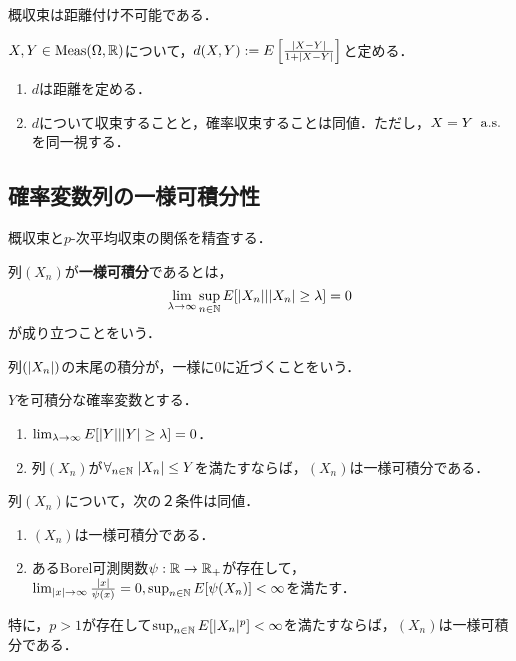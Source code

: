 \documentclass[uplatex,dvipdfmx]{jsreport}
\begin{document}
\begin{proposition}
    概収束は距離付け不可能である．
\end{proposition}

\begin{proposition}
    $X,Y\in\mathrm{Meas}(\Omega,\mathbb{R})$について，$d(X,Y):=E\left[\frac{\lvert X-Y\rvert}{1+\lvert X-Y\rvert}\right]$と定める．
    \begin{enumerate}
        \item $d$は距離を定める．
        \item $d$について収束することと，確率収束することは同値．ただし，$X=Y\;\;\mathrm{a.s.}$を同一視する．
    \end{enumerate}
\end{proposition}

\subsection{確率変数列の一様可積分性}

\begin{tcolorbox}[colframe=ForestGreen, colback=ForestGreen!10!white,breakable,colbacktitle=ForestGreen!40!white,coltitle=black,fonttitle=\bfseries\sffamily,
title=]
    概収束と$p$-次平均収束の関係を精査する．

\end{tcolorbox}

\begin{definition}
    列$(X_n)$が\textbf{一様可積分}であるとは，
    \[\lim_{\lambda\to\infty}\sup_{n\in\mathbb{N}}E[\lvert X_n\rvert|\lvert X_n\rvert\ge\lambda]=0\]
    が成り立つことをいう．
\end{definition}
\begin{remarks}
    列$(\lvert X_n\rvert)$の末尾の積分が，一様に$0$に近づくことをいう．
\end{remarks}

\begin{lemma}[一様可積分性の十分条件]
    $Y$を可積分な確率変数とする．
    \begin{enumerate}
        \item $\lim_{\lambda\to\infty}E[\lvert Y\rvert|\lvert Y\rvert\ge\lambda]=0$．
        \item 列$(X_n)$が$\forall_{n\in\mathbb{N}}\;\lvert X_n\rvert\le Y$を満たすならば，$(X_n)$は一様可積分である．
    \end{enumerate}
\end{lemma}

\begin{lemma}[一様可積分性の特徴付け]
    列$(X_n)$について，次の２条件は同値．
    \begin{enumerate}
        \item $(X_n)$は一様可積分である．
        \item あるBorel可測関数$\psi:\mathbb{R}\to\mathbb{R}_+$が存在して，$\lim_{\lvert x\rvert\to\infty}\frac{\lvert x\rvert}{\psi(x)}=0,\sup_{n\in\mathbb{N}}E[\psi(X_n)]<\infty$を満たす．
    \end{enumerate}
    特に，$p>1$が存在して$\sup_{n\in\mathbb{N}}E[\lvert X_n\rvert^p]<\infty$を満たすならば，$(X_n)$は一様可積分である．
\end{lemma}
\end{document}

